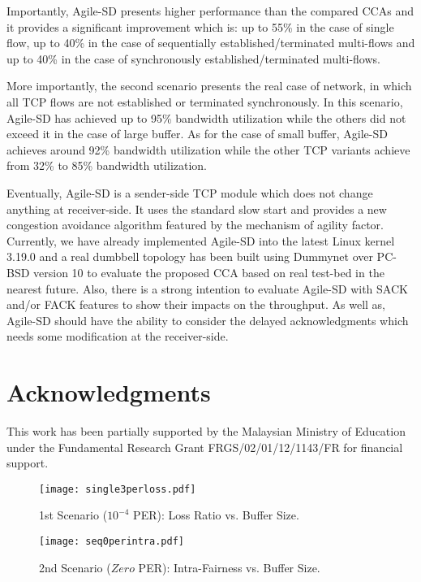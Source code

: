 \documentclass[preprint,3p,times,twocolumn,authoryear]{elsarticle}
\begin{document}
Importantly, Agile-SD presents higher performance than the compared CCAs and it provides a significant improvement which is: up to 55\% in the case of single flow, up to 40\% in the case of sequentially established/terminated multi-flows and up to 40\% in the case of synchronously established/terminated multi-flows.

More importantly, the second scenario presents the real case of network, in which all TCP flows are not established or terminated synchronously. In this scenario, Agile-SD has achieved up to 95\% bandwidth utilization while the others did not exceed it in the case of large buffer. As for the case of small buffer, Agile-SD achieves around 92\% bandwidth utilization while the other TCP variants achieve from 32\% to 85\% bandwidth utilization.

Eventually, Agile-SD is a sender-side TCP module which does not change anything at receiver-side. It uses the standard slow start and provides a new congestion avoidance algorithm featured by the mechanism of agility factor. Currently, we have already implemented Agile-SD into the latest Linux kernel 3.19.0 and a real dumbbell topology has been built using Dummynet over PC-BSD version 10 to evaluate the proposed CCA based on real test-bed in the nearest future. Also, there is a strong intention to evaluate Agile-SD with SACK and/or FACK features to show their impacts on the throughput. As well as, Agile-SD should have the ability to consider the delayed acknowledgments which needs some modification at the receiver-side.

\section*{Acknowledgments}
This work has been partially supported by the Malaysian Ministry of Education under the Fundamental Research Grant FRGS/02/01/12/1143/FR for financial support.\\

\begin{figure}[h!]
\centering
\texttt{[image: single3perloss.pdf]}
\caption{1st Scenario ($10^{-4}$ PER): Loss Ratio vs. Buffer Size.}
\label{fig:single3perloss}
\end{figure}

\begin{figure}[h!]
\centering
\texttt{[image: seq0perintra.pdf]}
\caption{2nd Scenario ($Zero$ PER): Intra-Fairness vs. Buffer Size.}
\label{fig:seq0perintra}
\end{figure}
\end{document}
